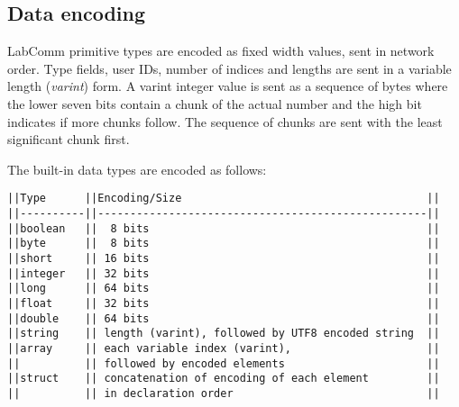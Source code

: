 \documentclass[a4paper]{article}
\begin{document}
\subsection{Data encoding}
LabComm primitive types are encoded as fixed width values, sent in
network order.  Type fields, user IDs, number of indices and lengths are
sent in a variable length (\emph{varint}) form.  A varint integer value
is sent as a sequence of bytes where the lower seven bits contain a
chunk of the actual number and the high bit indicates if more chunks
follow. The sequence of chunks are sent with the least significant chunk
first.  

The built-in data types are encoded as follows:
\begin{lstlisting}[basicstyle=\footnotesize\ttfamily]
||Type      ||Encoding/Size                                      ||
||----------||---------------------------------------------------||
||boolean   ||  8 bits                                           ||
||byte      ||  8 bits                                           ||
||short     || 16 bits                                           ||
||integer   || 32 bits                                           ||
||long      || 64 bits                                           ||
||float     || 32 bits                                           ||
||double    || 64 bits                                           ||
||string    || length (varint), followed by UTF8 encoded string  ||
||array     || each variable index (varint),                     ||
||          || followed by encoded elements                      ||
||struct    || concatenation of encoding of each element         ||
||          || in declaration order                              ||
\end{lstlisting}
\end{document}

